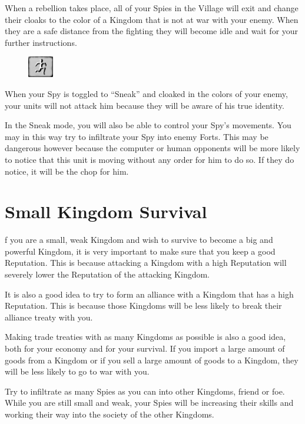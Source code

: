 When a rebellion takes place, all of your Spies in the Village will exit and change their cloaks to the color of a Kingdom that is not at war with your enemy. When they are a safe distance from the fighting they will become idle and wait for your further instructions.

\begin{figure}
	\vspace{-20pt}
	\begin{center}
		\includegraphics[width=0.1\textwidth]{Tsneak}
	\end{center}
	\vspace{-20pt}
\end{figure}

When your Spy is toggled to “Sneak” and cloaked in the colors of your enemy, your units will not attack him because they will be aware of his true identity.

In the Sneak mode, you will also be able to control your Spy’s movements. You may in this way try to infiltrate your Spy into enemy Forts. This may be dangerous however because the computer or human opponents will be more likely to notice that this unit is moving without any order for him to do so. If they do notice, it will be the chop for him.

\section{Small Kingdom Survival}


f you are a small, weak Kingdom and wish to survive to become a big and powerful Kingdom, it is very important to make sure that you keep a good Reputation. This is because attacking a Kingdom with a high Reputation will severely lower the Reputation of the attacking Kingdom.

It is also a good idea to try to form an alliance with a Kingdom that has a high Reputation. This is because those Kingdoms will be less likely to break their alliance treaty with you.

Making trade treaties with as many Kingdoms as possible is also a good idea, both for your economy and for your survival. If you import a large amount of goods from a Kingdom or if you sell a large amount of goods to a Kingdom, they will be less likely to go to war with you.

Try to infiltrate as many Spies as you can into other Kingdoms, friend or foe. While you are still small and weak, your Spies will be increasing their skills and working their way into the society of the other Kingdoms.